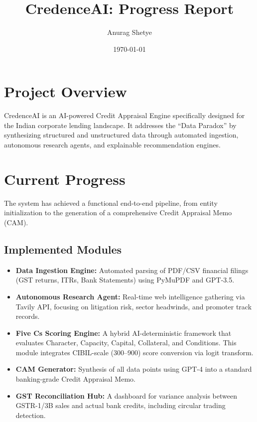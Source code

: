 \documentclass[11pt]{article}
\title{\textbf{CredenceAI: Progress Report}}
\author{Anurag Shetye}
\date{\today}
\begin{document}
\maketitle

\section{Project Overview}
CredenceAI is an AI-powered Credit Appraisal Engine specifically designed for the Indian corporate lending landscape. It addresses the ``Data Paradox'' by synthesizing structured and unstructured data through automated ingestion, autonomous research agents, and explainable recommendation engines.

\section{Current Progress}
The system has achieved a functional end-to-end pipeline, from entity initialization to the generation of a comprehensive Credit Appraisal Memo (CAM).

\subsection{Implemented Modules}
\begin{itemize}[noitemsep]
    \item \textbf{Data Ingestion Engine:} Automated parsing of PDF/CSV financial filings (GST returns, ITRs, Bank Statements) using PyMuPDF and GPT-3.5.
    \item \textbf{Autonomous Research Agent:} Real-time web intelligence gathering via Tavily API, focusing on litigation risk, sector headwinds, and promoter track records.
    \item \textbf{Five Cs Scoring Engine:} A hybrid AI-deterministic framework that evaluates Character, Capacity, Capital, Collateral, and Conditions. This module integrates CIBIL-scale (300--900) score conversion via logit transform.
    \item \textbf{CAM Generator:} Synthesis of all data points using GPT-4 into a standard banking-grade Credit Appraisal Memo.
    \item \textbf{GST Reconciliation Hub:} A dashboard for variance analysis between GSTR-1/3B sales and actual bank credits, including circular trading detection.
\end{itemize}
\end{document}
